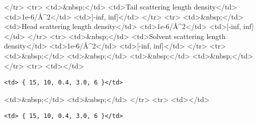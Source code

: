 \textless{}/tr\textgreater{} \textless{}tr\textgreater{} \textless{}td\textgreater{}\&nbsp;\textless{}/td\textgreater{} \textless{}td\textgreater{}Tail scattering length density\textless{}/td\textgreater{} \textless{}td\textgreater{}1e-6/\AA{}\textasciicircum{}2\textless{}/td\textgreater{} \textless{}td\textgreater{}[-inf, inf]\textless{}/td\textgreater{} \textless{}/tr\textgreater{} \textless{}tr\textgreater{} \textless{}td\textgreater{}\&nbsp;\textless{}/td\textgreater{} \textless{}td\textgreater{}Head scattering length density\textless{}/td\textgreater{} \textless{}td\textgreater{}1e-6/\AA{}\textasciicircum{}2\textless{}/td\textgreater{} \textless{}td\textgreater{}[-inf, inf]\textless{}/td\textgreater{} \textless{}/tr\textgreater{} \textless{}tr\textgreater{} \textless{}td\textgreater{}\&nbsp;\textless{}/td\textgreater{} \textless{}td\textgreater{}Solvent scattering length density\textless{}/td\textgreater{} \textless{}td\textgreater{}1e-6/\AA{}\textasciicircum{}2\textless{}/td\textgreater{} \textless{}td\textgreater{}[-inf, inf]\textless{}/td\textgreater{} \textless{}/tr\textgreater{} \textless{}tr\textgreater{} \textless{}td\textgreater{}\&nbsp;\textless{}/td\textgreater{} \textless{}td\textgreater{}\&nbsp;\textless{}/td\textgreater{} \textless{}td\textgreater{}\&nbsp;\textless{}/td\textgreater{} \textless{}td\textgreater{}\&nbsp;\textless{}/td\textgreater{} \textless{}/tr\textgreater{} \textless{}tr\textgreater{} \textless{}td\textgreater{}\textless{}/td\textgreater{}

\begin{verbatim}
<td> { 15, 10, 0.4, 3.0, 6 }</td>
\end{verbatim}

\textless{}td\textgreater{}\&nbsp;\textless{}/td\textgreater{} \textless{}td\textgreater{}\&nbsp;\textless{}/td\textgreater{} \textless{}/tr\textgreater{} \textless{}tr\textgreater{} \textless{}td\textgreater{}\textless{}/td\textgreater{}

\begin{verbatim}
<td> { 15, 10, 0.4, 3.0, 6 }</td>
\end{verbatim}


